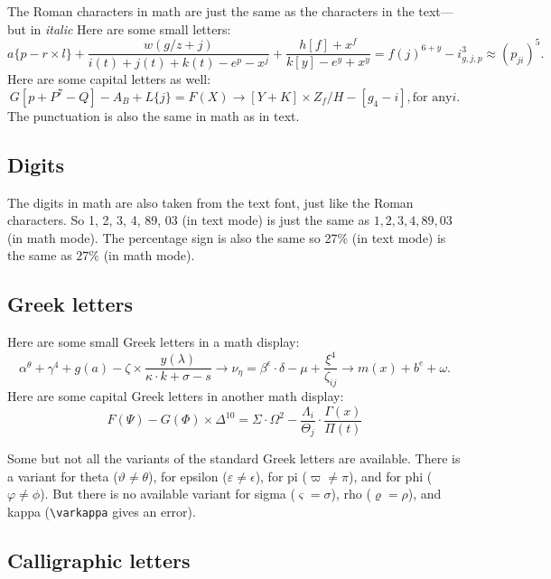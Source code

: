 \documentclass{article}
\begin{document}
The Roman characters in math are just the same as the characters in the text---but in \textit{italic} Here are some small letters: 
\[

a\lbrace p - r \times l\rbrace  + \frac{w(g/z+j)}{i(t)+j(t)+k(t) - e^p - x^j} + \frac{h[f]+x^f}{k[y]-e^y + x^y} = f(j)^{6+y} - i^3_{g,j,p} \approx (p_{ji})^5.

\]
Here are some capital letters as well: 
\[

G[p + P^7-Q] - A_B + L\lbrace j\rbrace  = F(X) \to [Y+K]\times Z_f/H - [g_4 - i], \text{for any} i.

\]
The punctuation is also the same in math as in text. 

\subsection{Digits}

The digits in math are also taken from the text font, just like the Roman characters. So 1, 2, 3, 4, 89, 03 (in text mode) is just the same as $1, 2, 3, 4, 89, 03$ (in math mode). The percentage sign is also the same so 27\% (in text mode) is the same as $27\%$ (in math mode).

\subsection{Greek letters}

Here are some small Greek letters in a math display: 
\[

\alpha^{\theta} + \gamma^4 + g(a) - \zeta \times \frac{y(\lambda)}{\kappa \cdot k+ \sigma - s} \to \nu_{\eta} = \beta^\epsilon \cdot \delta - \mu + \frac{\xi^4}{\zeta_{ij}} \to m(x) + b^e + \omega .

\]
Here are some capital Greek letters in another math display: 
\setcounter{paperref}{0}\label{e:capitalgreek}\[

F(\Psi) - G(\Phi) \times \Delta^{10} = \Sigma \cdot \Omega^2 - \frac{\Lambda_i}{\Theta_j} \cdot \frac{\Gamma(x)}{\Pi(t)}
\tag{1}
\]

Some but not all the variants of the standard Greek letters are available. There is a variant for theta ($\vartheta \neq \theta$), for epsilon ($\varepsilon \neq \epsilon$), for pi ($\varpi \neq \pi$), and for phi ($\varphi \neq \phi$). But there is no available variant for sigma ($\varsigma = \sigma$), rho ($\varrho = \rho$), and kappa (\texttt{\textbackslash varkappa} gives an error).

\subsection{Calligraphic letters} 
\end{document}
